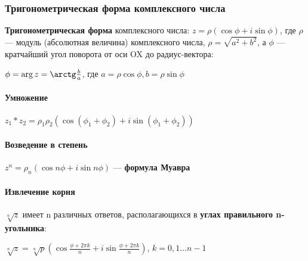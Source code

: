 \documentclass{article}
\begin{document}
\begin{flushleft}
\subsubsection{Тригонометрическая форма комплексного числа}

\textbf{Тригонометрическая форма} комплексного числа: $z = \rho (\cos \phi + i\sin \phi)$, где $\rho$ — модуль (абсолютная величина) комплексного числа, $\rho = \sqrt{a^2 + b^2}$, а $\phi$ — кратчайший угол поворота от оси OX до радиус-вектора:

\hspace{5mm} $\phi = \arg z = \arctg \frac{b}{a}$, где $a = \rho \cos \phi, b = \rho \sin \phi$

\paragraph{Умножение}

$z_1 * z_2 = \rho_1 \rho_2 (\cos(\phi_1 + \phi_2) + i\sin(\phi_1 + \phi_2))$

\paragraph{Возведение в степень}

$z^n = \rho_n (\cos n\phi + i\sin n\phi)$ — \textbf{формула Муавра}

\paragraph{Извлечение корня}

$\sqrt[n]{z}$ имеет n различных ответов, располагающихся в \textbf{углах правильного n-угольника}:

\hspace{5mm} $\sqrt[n]{z} = \sqrt[n]{p} (\cos \frac{\phi + 2\pi k}{n} + i\sin \frac{\phi + 2\pi k}{n})$, $k = 0, 1 \dots n - 1$

\end{flushleft}
\end{document}
